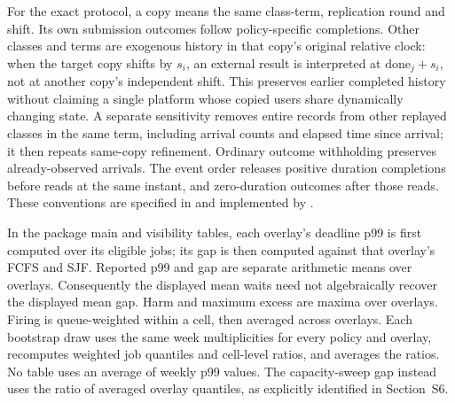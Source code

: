 \documentclass[mathematics,supfile,submit,moreauthors]{Definitions/mdpi}
\begin{document}
For the exact protocol, a copy means the same class-term, replication
round and shift. Its own submission outcomes follow policy-specific completions.
Other classes and terms are exogenous history in that copy's original relative
clock: when the target copy shifts by $s_i$, an external result is interpreted at
$\mathrm{done}_j+s_i$, not at another copy's independent shift. This preserves
earlier completed history without claiming a single platform whose copied users
share dynamically changing state. A separate sensitivity removes entire records
from other replayed classes in the same term, including arrival counts and elapsed
time since arrival; it then repeats same-copy refinement. Ordinary outcome
withholding preserves already-observed arrivals. The event order releases positive
duration completions before reads at the same instant, and zero-duration outcomes
after those reads. These conventions are specified in
 and implemented by
.

In the package main and visibility tables, each overlay's deadline p99 is first
computed over its eligible jobs; its gap is then computed against that overlay's
FCFS and SJF. Reported p99 and gap are separate arithmetic means over overlays.
Consequently the displayed mean waits need not algebraically recover the displayed
mean gap. Harm and maximum excess are maxima over overlays. Firing is
queue-weighted within a cell, then averaged across overlays. Each bootstrap draw
uses the same week multiplicities for every policy and overlay, recomputes weighted
job quantiles and cell-level ratios, and averages the ratios. No table uses an
average of weekly p99 values. The capacity-sweep gap instead uses the ratio of
averaged overlay quantiles, as explicitly identified in Section~S6.
\end{document}
